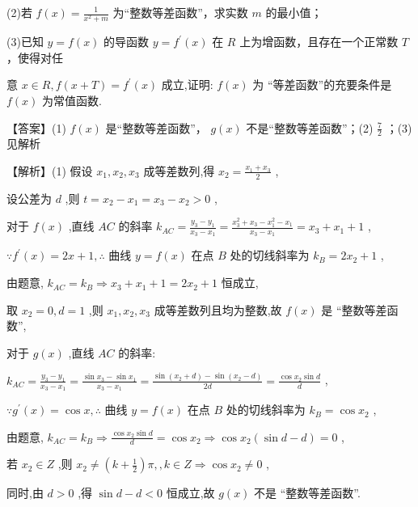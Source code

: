 \documentclass[10pt]{article}
\begin{document}
(2)若 \(f\left( x\right)  = \frac{1}{{x}^{2} + m}\) 为“整数等差函数”，求实数 \(m\) 的最小值；

(3)已知 \(y = f\left( x\right)\) 的导函数 \(y = {f}^{\prime }\left( x\right)\) 在 \(R\) 上为增函数，且存在一个正常数 \(T\) ，使得对任

意 \(x \in  R,f\left( {x + T}\right)  = {f}^{\prime }\left( x\right)\) 成立,证明: \(f\left( x\right)\) 为 “等差函数”的充要条件是 \(f\left( x\right)\) 为常值函数.

【答案】(1) \(f\left( x\right)\) 是“整数等差函数”， \(g\left( x\right)\) 不是“整数等差函数”；(2) \(\frac{7}{2}\) ；(3)见解析

【解析】(1) 假设 \({x}_{1},{x}_{2},{x}_{3}\) 成等差数列,得 \({x}_{2} = \frac{{x}_{1} + {x}_{3}}{2}\) ,

设公差为 \(d\) ,则 \(t = {x}_{2} - {x}_{1} = {x}_{3} - {x}_{2} > 0\) ,

对于 \(f\left( x\right)\) ,直线 \({AC}\) 的斜率 \({k}_{AC} = \frac{{y}_{3} - {y}_{1}}{{x}_{3} - {x}_{1}} = \frac{{x}_{3}^{2} + {x}_{3} - {x}_{1}^{2} - {x}_{1}}{{x}_{3} - {x}_{1}} = {x}_{3} + {x}_{1} + 1\) ,

\(\because {f}^{\prime }\left( x\right)  = {2x} + 1,\therefore\) 曲线 \(y = f\left( x\right)\) 在点 \(B\) 处的切线斜率为 \({k}_{B} = 2{x}_{2} + 1\) ,

由题意, \({k}_{AC} = {k}_{B} \Rightarrow  {x}_{3} + {x}_{1} + 1 = 2{x}_{2} + 1\) 恒成立,

取 \({x}_{2} = 0,d = 1\) ,则 \({x}_{1},{x}_{2},{x}_{3}\) 成等差数列且均为整数,故 \(f\left( x\right)\) 是 “整数等差函数”,

对于 \(g\left( x\right)\) ,直线 \({AC}\) 的斜率:

\({k}_{AC} = \frac{{y}_{3} - {y}_{1}}{{x}_{3} - {x}_{1}} = \frac{\sin {x}_{3} - \sin {x}_{1}}{{x}_{3} - {x}_{1}} = \frac{\sin \left( {{x}_{2} + d}\right)  - \sin \left( {{x}_{2} - d}\right) }{2d} = \frac{\cos {x}_{2}\sin d}{d}\) ,

\(\because {g}^{\prime }\left( x\right)  = \cos x,\therefore\) 曲线 \(y = f\left( x\right)\) 在点 \(B\) 处的切线斜率为 \({k}_{B} = \cos {x}_{2}\) ,

由题意, \({k}_{AC} = {k}_{B} \Rightarrow  \frac{\cos {x}_{2}\sin d}{d} = \cos {x}_{2} \Rightarrow  \cos {x}_{2}\left( {\sin d - d}\right)  = 0\) ,

若 \({x}_{2} \in  Z\) ,则 \({x}_{2} \neq  \left( {k + \frac{1}{2}}\right) \pi ,,k \in  Z \Rightarrow  \cos {x}_{2} \neq  0\) ,

同时,由 \(d > 0\) ,得 \(\sin d - d < 0\) 恒成立,故 \(g\left( x\right)\) 不是 “整数等差函数”.
\end{document}
